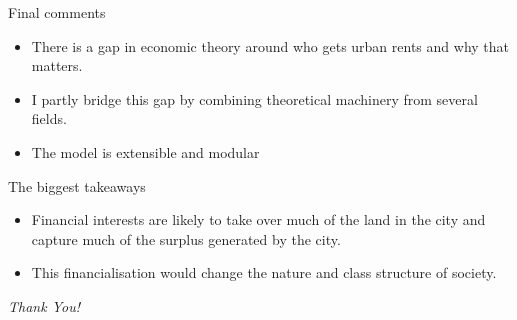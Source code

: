 \documentclass[]{beamer} %
\begin{document}
\begin{frame}{Final comments}
 \begin{itemize}[<+->] \Large
\item There is a gap in economic theory around who gets urban rents and why that matters.
\item I partly bridge this gap by combining theoretical machinery from several fields. %
\item The model is extensible and modular

\end{itemize}
\end{frame}
\begin{frame}{The biggest takeaways} 
\Large
\begin{itemize}[<+->]
    \item Financial interests are likely to take over much of the land in the city and capture much of the surplus generated by the city.\vspace{.5cm}
    \item This financialisation would change the nature and class structure of society.
\end{itemize}
\end{frame}
\begin{frame}
  \centering \Huge

  \emph{Thank You!}
\end{frame}
\end{document}
